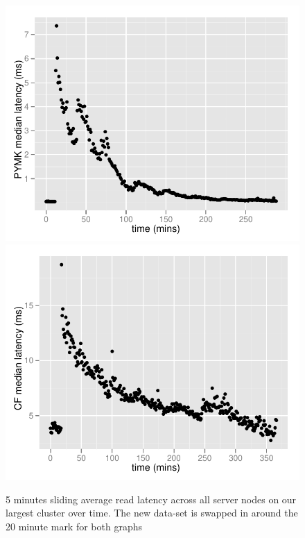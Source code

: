 \begin{figure}
  \centering
    \includegraphics[scale=0.55]{images/pymk_search.pdf}
    \includegraphics[scale=0.55]{images/browsemap_search.pdf}
  \caption{5 minutes sliding average read latency across all server nodes on our largest cluster over time. The new data-set is swapped in around the 20 minute mark for both graphs}
  \label{production}
\end{figure}

